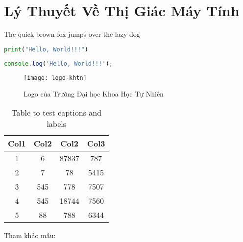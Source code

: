 \chapter{Lý Thuyết Về Thị Giác Máy Tính}
\label{computer_vision_background}

The quick brown fox jumps over the lazy dog



\begin{lstlisting}[language=Python]
print("Hello, World!!!")
\end{lstlisting}

\begin{lstlisting}[language=JavaScript]
console.log('Hello, World!!!');
\end{lstlisting}

\begin{figure}[h]
	\centering
	\texttt{[image: logo-khtn]}
	\caption{Logo của Trường Đại học Khoa Học Tự Nhiên}
\end{figure}

\begin{table}[h!]
	\centering
	\begin{tabular}{||c c c c||} 
		\hline
		Col1 & Col2 & Col2 & Col3 \\ [0.5ex] 
		\hline\hline
		1 & 6 & 87837 & 787 \\ 
		2 & 7 & 78 & 5415 \\
		3 & 545 & 778 & 7507 \\
		4 & 545 & 18744 & 7560 \\
		5 & 88 & 788 & 6344 \\ [1ex] 
		\hline
	\end{tabular}
	\caption{Table to test captions and labels}
	\label{table:1}
\end{table}

Tham khảo mẫu: \cite{1984-TeX-Knuth}